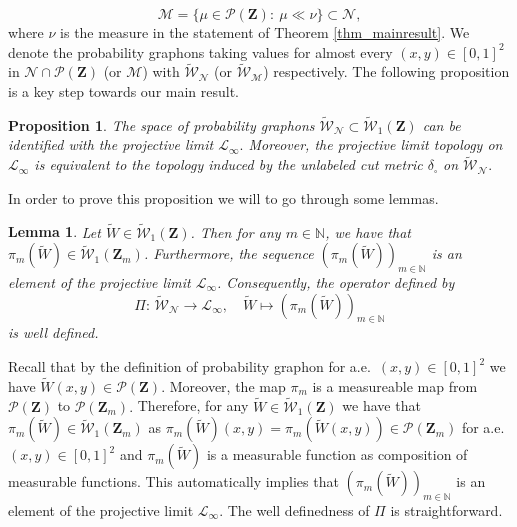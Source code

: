 \documentclass[12pt,twoside,a4paper]{article}
\newtheorem{proposition}{Proposition}[section]
\newtheorem{lemma}[theorem]{Lemma}
\newcommand{\Space}{\mathbf{Z}}
\newcommand{\UGraphon}{\widetilde{\mathcal{W}}_1}
\begin{document}
\begin{equation}
    \mathcal{M}=\{\mu\in \mathcal{P}(\Space): \ \mu \ll \nu\}\subset \mathcal{N},
\end{equation}
where $\nu$ is the measure in the statement of Theorem \ref{thm_mainresult}.
We denote the probability graphons taking values for almost every $(x,y)\in [0,1]^2$ in $\mathcal{N}\cap\mathcal{P}(\Space)$ (or $\mathcal{M}$) with $\widetilde{\mathcal{W}}_{\mathcal{N}}$ (or $\widetilde{\mathcal{W}}_{\mathcal{M}}$) respectively. The following proposition is a key step towards our main result.

\begin{proposition}\label{Prop:ProjectiveLimDawsonGart}
 The space of probability graphons $\widetilde{\mathcal{W}}_{\mathcal{N}}\subset\UGraphon(\Space)$ can be identified with the projective limit $\mathcal{L}_{\infty}.$ Moreover, the projective limit topology on $\mathcal{L}_{\infty}$ is equivalent to the topology induced by the unlabeled cut metric $\delta_{\square}$ on $\widetilde{\mathcal{W}}_{\mathcal{N}}.$
\end{proposition}

In order to prove this proposition we will to go through some lemmas.


\begin{lemma}\label{lemm:Pi1}
 Let $\widetilde{W}\in \UGraphon(\Space)$. Then for any $m \in \mathbb{N}$, we have that $\pi_m(\widetilde{W}) \in \UGraphon(\Space_m)$. Furthermore, the sequence $(\pi_m(\widetilde{W}))_{m \in \mathbb{N}}$ is an element of the projective limit $\mathcal{L}_\infty$. Consequently, the operator defined by
 \begin{equation*}
\Pi:\,\widetilde{\mathcal{W}}_{\mathcal{N}}\rightarrow \mathcal{L}_\infty, \quad \widetilde{W}\mapsto  (\pi_m(\widetilde{W}))_{m \in \mathbb{N}}
 \end{equation*}
 is well defined.
\end{lemma}
\proof
Recall that by the definition of probability graphon for a.e.\ $(x,y)\in [0,1]^2$ we have $\widetilde{W}(x,y)\in \mathcal{P}(\Space).$ Moreover, the map $\pi_m$ is a measureable map from $ \mathcal{P}(\Space)$ to $ \mathcal{P}(\Space_m).$ 
Therefore, for any $\widetilde{W}\in \UGraphon(\Space)$ we have that $\pi_m(\widetilde{W})\in \UGraphon(\Space_m)$ as $\pi_m(\widetilde{W})(x,y)=\pi_m(\widetilde{W}(x,y))\in \mathcal{P}(\Space_m)$ for a.e.\ $(x,y)\in [0,1]^2$ and  $\pi_m(\widetilde{W})$ is a measurable function as composition of measurable functions. This automatically implies that $(\pi_m(\widetilde{W}))_{m \in \mathbb{N}}$ is an element of the projective limit $\mathcal{L}_\infty$. The well definedness of $\Pi$ is straightforward.
\endproof
\end{document}
